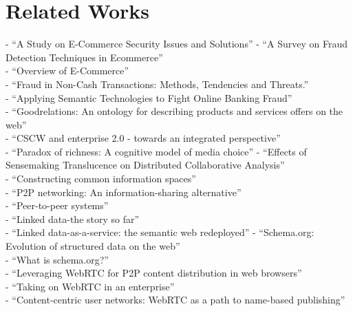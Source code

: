 
\chapter{Related Works}
\label{cha:related_works}
- ``A Study on E-Commerce Security Issues and Solutions'' \citep{sen2015study}
- ``A Survey on Fraud Detection Techniques in Ecommerce'' \citep{rana2015survey} \\
- ``Overview of E-Commerce'' \citep{ankhule2015overview} \\
- ``Fraud in Non-Cash Transactions: Methods, Tendencies and Threats.'' \citep{sobko2014fraud} \\
- ``Applying Semantic Technologies to Fight Online Banking Fraud'' \citep{carvalhoapplying} \\
- ``Goodrelations: An ontology for describing products and services offers on the web'' \citep{hepp2008goodrelations} \\
- ``CSCW and enterprise 2.0 - towards an integrated perspective'' \citep{Koch2008} \\
- ``Paradox of richness: A cognitive model of media choice'' \citep{robert2005paradox}
- ``Effects of Sensemaking Translucence on Distributed Collaborative Analysis'' \citep{goyaleffects} \\
- ``Constructing common information spaces'' \citep{bannon1997constructing} \\
- ``P2P networking: An information-sharing alternative'' \citep{parameswaran2001p2p} \\
- ``Peer-to-peer systems'' \citep{rodrigues2010peer} \\
- ``Linked data-the story so far'' \citep{bizer2009linked} \\
- ``Linked data-as-a-service: the semantic web redeployed'' \citep{rietveld2015linked}
- ``Schema.org: Evolution of structured data on the web'' \citep{guha2016schema} \\
- ``What is schema.org?'' \citep{barker2014schema} \\
- ``Leveraging WebRTC for P2P content distribution in web browsers'' \citep{vogt2013leveraging} \\
- ``Taking on WebRTC in an enterprise'' \citep{vogt2013leveraging} \\
- ``Content-centric user networks: WebRTC as a path to name-based publishing'' \citep{vogt2013content}

